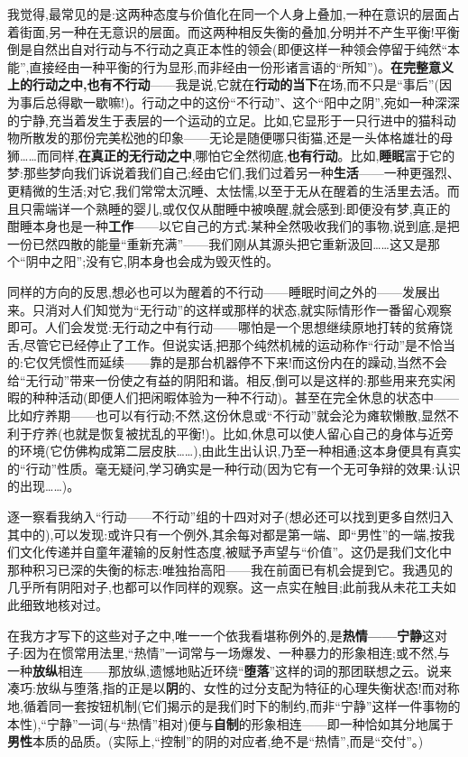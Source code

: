 我觉得,最常见的是:这两种态度与价值化在同一个人身上叠加,一种在意识的层面占着街面,另一种在无意识的层面。而这两种相反失衡的叠加,分明并不产生平衡!平衡倒是自然出自对行动与不行动之真正本性的领会(即便这样一种领会停留于纯然“本能”,直接经由一种平衡的行为显形,而非经由一份形诸言语的“所知”)。\textbf{在完整意义上的行动之中,也有不行动}——我是说,它就在\textbf{行动的当下}在场,而不只是“事后”(因为事后总得歇一歇嘛!)。行动之中的这份“不行动”、这个“阳中之阴”,宛如一种深深的宁静,充当着发生于表层的一个运动的立足。比如,它显形于一只行进中的猫科动物所散发的那份完美松弛的印象——无论是随便哪只街猫,还是一头体格雄壮的母狮……而同样,\textbf{在真正的无行动之中},哪怕它全然彻底,\textbf{也有行动}。比如,\textbf{睡眠}富于它的梦:那些梦向我们诉说着我们自己;经由它们,我们过着另一种\textbf{生活}——一种更强烈、更精微的生活;对它,我们常常太沉睡、太怯懦,以至于无从在醒着的生活里去活。而且只需端详一个熟睡的婴儿,或仅仅从酣睡中被唤醒,就会感到:即便没有梦,真正的酣睡本身也是一种\textbf{工作}——以它自己的方式:某种全然吸收我们的事物,说到底,是把一份已然四散的能量“重新充满”——我们刚从其源头把它重新汲回……这又是那个“阴中之阳”;没有它,阴本身也会成为毁灭性的。

\dmark{}同样的方向的反思,想必也可以为醒着的不行动——睡眠时间之外的——发展出来。只消对人们知觉为“无行动”的这样或那样的状态,就实际情形作一番留心观察即可。人们会发觉:无行动之中有行动——哪怕是一个思想继续原地打转的贫瘠饶舌,尽管它已经停止了工作。但说实话,把那个纯然机械的运动称作“行动”是不恰当的:它仅凭惯性而延续——靠的是那台机器停不下来!而这份内在的躁动,当然不会给“无行动”带来一份使之有益的阴阳和谐。相反,倒可以是这样的:那些用来充实闲暇的种种活动(即便人们把闲暇体验为一种不行动)。甚至在完全休息的状态中——比如疗养期——也可以有行动;不然,这份休息或“不行动”就会沦为瘫软懒散,显然不利于疗养(也就是恢复被扰乱的平衡!)。比如,休息可以使人留心自己的身体与近旁的环境(它仿佛构成第二层皮肤……),由此生出认识,乃至一种相通;这本身便具有真实的“行动”性质。毫无疑问,学习确实是一种行动(因为它有一个无可争辩的效果:认识的出现……)。

逐一察看我纳入“行动——不行动”组的十四对对子(想必还可以找到更多自然归入其中的),可以发现:或许只有一个例外,其余每对都是第一端、即“男性”的一端,按我们文化传递并自童年灌输的反射性态度,被赋予声望与“价值”。这仍是我们文化中那种积习已深的失衡的标志:唯独抬高阳——我在前面已有机会提到它\dmark{}。我遇见的几乎所有阴阳对子,也都可以作同样的观察。这一点实在触目;此前我从未花工夫如此细致地核对过。

在我方才写下的这些对子之中,唯一一个依我看堪称例外的,是\textbf{热情——宁静}这对子:因为在惯常用法里,“热情”一词常与一场爆发、一种暴力的形象相连;或不然,与一种\textbf{放纵}相连——那放纵,遗憾地贴近环绕“\textbf{堕落}”这样的词的那团联想之云。说来凑巧:放纵与堕落,指的正是以\textbf{阴}的、女性的过分支配为特征的心理失衡状态!而对称地,循着同一套按钮机制(它们揭示的是我们时下的制约,而非“宁静”这样一件事物的本性),“宁静”一词(与“热情”相对)便与\textbf{自制}的形象相连——即一种恰如其分地属于\textbf{男性}本质的品质。(实际上,“控制”的阴的对应者,绝不是“热情”,而是“交付”。)


